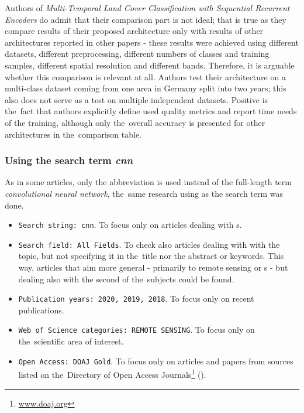 
Authors of \textit{Multi-Temporal Land Cover Classification with Sequential Recurrent Encoders} do admit that their comparison part is not ideal; that is true as they compare results of their proposed architecture only with results of other architectures reported in other papers - these results were achieved using different datasets, different preprocessing, different numbers of classes and training samples, different spatial resolution and different bands. Therefore, it is arguable whether this comparison is relevant at all. Authors test their architecture on a multi-class dataset coming from one area in Germany split into two years; this also does not serve as a test on multiple independent datasets. Positive is the~fact that authors explicitly define used quality metrics and report time needs of the training, although only the~overall accuracy is presented for other architectures in the~comparison table.

\subsubsection{Using the search term \textit{cnn}}
\label{wos-papers-cnn}

As in some articles, only the abbreviation \textit{} is used instead of the full-length term \textit{convolutional neural network}, the~same research using \textit{} as the search term was done.

\begin{itemize}
	\item \verb|Search string: cnn|. To focus only on articles dealing with s.
	\item \verb|Search field: All Fields|. To check also articles dealing with with the topic, but not specifying it in the~title nor the abstract or keywords. This way, articles that aim more general - primarily to remote sensing or s - but dealing also with the second of the~subjects could be found.
	\item \verb|Publication years: 2020, 2019, 2018|. To focus only on recent publications.
	\item \verb|Web of Science categories: REMOTE SENSING|. To focus only on the~scien\-ti\-fic area of interest.
	\item \verb|Open Access: DOAJ Gold|. To focus only on articles and papers from sources listed on the~Di\-rectory of Open Access Journals\footnote{\url{www.doaj.org}} ().
\end{itemize}

